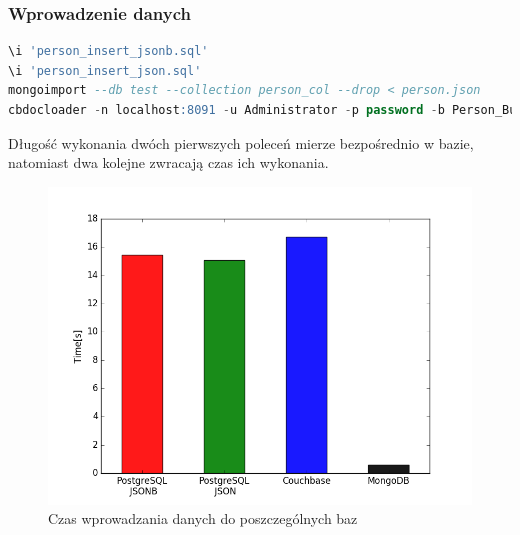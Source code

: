 \documentclass[a4paper,12pt,table]{article}
\begin{document}
{\subsubsection{Wprowadzenie danych}
\begin{lstlisting}[language=SQL,basicstyle=\footnotesize]
\i 'person_insert_jsonb.sql'
\i 'person_insert_json.sql'
mongoimport --db test --collection person_col --drop < person.json
cbdocloader -n localhost:8091 -u Administrator -p password -b Person_Bucket Person_Bucket.zip
\end{lstlisting}
\vspace{0.5cm}
Długość wykonania dwóch pierwszych poleceń mierze bezpośrednio w bazie, natomiast dwa kolejne zwracają czas ich wykonania.
\begin{figure}[h]
\begin{center}
\includegraphics[scale=0.48]{ax/fig0}
\end{center}
\caption{Czas wprowadzania danych do poszczególnych baz}
\end{figure}
}
\end{document}
